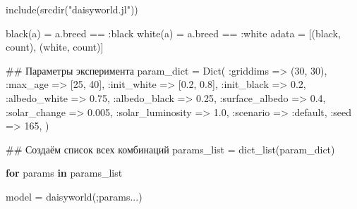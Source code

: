 \documentclass[
  english,
  russian,
  12pt,
  a4paper,
  DIV=11,
  numbers=noendperiod]{scrreprt}
\newenvironment{Shaded}{\begin{snugshade}}{\end{snugshade}}
\newcommand{\CommentTok}[1]{\textcolor[rgb]{0.37,0.37,0.37}{#1}}
\newcommand{\ControlFlowTok}[1]{\textcolor[rgb]{0.00,0.23,0.31}{\textbf{#1}}}
\newcommand{\FloatTok}[1]{\textcolor[rgb]{0.68,0.00,0.00}{#1}}
\newcommand{\FunctionTok}[1]{\textcolor[rgb]{0.28,0.35,0.67}{#1}}
\newcommand{\KeywordTok}[1]{\textcolor[rgb]{0.00,0.23,0.31}{\textbf{#1}}}
\newcommand{\NormalTok}[1]{\textcolor[rgb]{0.00,0.23,0.31}{#1}}
\newcommand{\OperatorTok}[1]{\textcolor[rgb]{0.37,0.37,0.37}{#1}}
\newcommand{\StringTok}[1]{\textcolor[rgb]{0.13,0.47,0.30}{#1}}
\begin{document}
\begin{Shaded}
\begin{Highlighting}[]
\FunctionTok{include}\NormalTok{(}\FunctionTok{srcdir}\NormalTok{(}\StringTok{"daisyworld.jl"}\NormalTok{))}


\FunctionTok{black}\NormalTok{(a) }\OperatorTok{=}\NormalTok{ a.breed }\OperatorTok{==} \OperatorTok{:}\NormalTok{black}
\FunctionTok{white}\NormalTok{(a) }\OperatorTok{=}\NormalTok{ a.breed }\OperatorTok{==} \OperatorTok{:}\NormalTok{white}
\NormalTok{adata }\OperatorTok{=}\NormalTok{ [(black, count), (white, count)]}

\CommentTok{\#\# Параметры эксперимента}
\NormalTok{param\_dict }\OperatorTok{=} \FunctionTok{Dict}\NormalTok{(}
    \OperatorTok{:}\NormalTok{griddims }\OperatorTok{=\textgreater{}}\NormalTok{ (}\FloatTok{30}\NormalTok{, }\FloatTok{30}\NormalTok{),}
    \OperatorTok{:}\NormalTok{max\_age }\OperatorTok{=\textgreater{}}\NormalTok{ [}\FloatTok{25}\NormalTok{, }\FloatTok{40}\NormalTok{],}
    \OperatorTok{:}\NormalTok{init\_white }\OperatorTok{=\textgreater{}}\NormalTok{ [}\FloatTok{0.2}\NormalTok{, }\FloatTok{0.8}\NormalTok{],}
    \OperatorTok{:}\NormalTok{init\_black }\OperatorTok{=\textgreater{}} \FloatTok{0.2}\NormalTok{,}
    \OperatorTok{:}\NormalTok{albedo\_white }\OperatorTok{=\textgreater{}} \FloatTok{0.75}\NormalTok{,}
    \OperatorTok{:}\NormalTok{albedo\_black }\OperatorTok{=\textgreater{}} \FloatTok{0.25}\NormalTok{,}
    \OperatorTok{:}\NormalTok{surface\_albedo }\OperatorTok{=\textgreater{}} \FloatTok{0.4}\NormalTok{,}
    \OperatorTok{:}\NormalTok{solar\_change }\OperatorTok{=\textgreater{}} \FloatTok{0.005}\NormalTok{,}
    \OperatorTok{:}\NormalTok{solar\_luminosity }\OperatorTok{=\textgreater{}} \FloatTok{1.0}\NormalTok{,}
    \OperatorTok{:}\NormalTok{scenario }\OperatorTok{=\textgreater{}} \OperatorTok{:}\NormalTok{default,}
    \OperatorTok{:}\NormalTok{seed }\OperatorTok{=\textgreater{}} \FloatTok{165}\NormalTok{,}
\NormalTok{)}

\CommentTok{\#\# Создаём список всех комбинаций}
\NormalTok{params\_list }\OperatorTok{=} \FunctionTok{dict\_list}\NormalTok{(param\_dict)}

\ControlFlowTok{for}\NormalTok{ params }\KeywordTok{in}\NormalTok{ params\_list}

\NormalTok{    model }\OperatorTok{=} \FunctionTok{daisyworld}\NormalTok{(;params}\OperatorTok{...}\NormalTok{)}


\end{Highlighting}
\end{Shaded}
\end{document}
